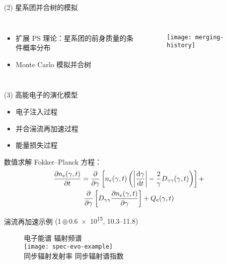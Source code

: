 \documentclass{beamer}
\begin{document}
\begin{frame}[t]
  \begin{alertblock}{(2) 星系团并合树的模拟}
  \end{alertblock}
  \begin{columns}
    \begin{itemize}
      \item 扩展 PS 理论：星系团的前身质量的条件概率分布
      \item Monte Carlo 模拟并合树
    \end{itemize}

    \begin{figure}
      \centering
      \texttt{[image: merging-history]}
    \end{figure}
  \end{columns}
\end{frame}

\begin{frame}[t]
  \begin{alertblock}{(3) 高能电子的演化模型}
    \begin{itemize}
      \item 电子注入过程
      \item 并合湍流再加速过程
      \item 能量损失过程
    \end{itemize}
    数值求解 Fokker--Planck 方程：
  \begin{multline}
    \frac{\partial n_e(\gamma, t)}{\partial t} =
      \frac{\partial }{\partial \gamma} \left[ n_e(\gamma, t) \left(
        \left| \frac{\text{d}\gamma}{\text{d}t} \right| -
        \frac{2}{\gamma} D_{\gamma\gamma}(\gamma, t) \right) \right] + \\
      \frac{\partial }{\partial \gamma} \left[
      D_{\gamma\gamma} \frac{\partial n_e(\gamma, t)}{\partial \gamma} \right]
      + Q_e(\gamma, t)
  \end{multline}
  \end{alertblock}
\end{frame}

\begin{frame}[t]
  \begin{block}{湍流再加速示例
    {\normalfont(1\,$\oplus$\,\SI{0.6e15}{\solarmass},
      \SIrange{10.3}{11.8}{\Gyr})}
  }
    \begin{figure}
      \centering\footnotesize
      \hspace{2.5em} 电子能谱 \hspace{9em} 辐射频谱 \\
      \texttt{[image: spec-evo-example]} \\
      \hspace{2.5em} 同步辐射发射率 \hspace{7em} 同步辐射谱指数
    \end{figure}
  \end{block}
\end{frame}
\end{document}
